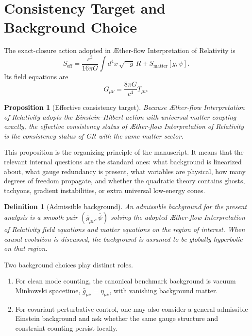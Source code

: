\documentclass[11pt]{article}
\newcommand{\Aflow}{\AE{}ther-flow}
\newcommand{\TheoryName}{\Aflow{} Interpretation of Relativity}
\newtheorem{definition}{Definition}
\newtheorem{proposition}{Proposition}
\begin{document}
\section{Consistency Target and Background Choice}

The exact-closure action adopted in \TheoryName{} is
\begin{equation}
S_{\mathrm{eff}}
=
\frac{c^3}{16\pi G}\int d^4x\,\sqrt{-g}\,R
+
S_{\mathrm{matter}}[g,\psi].
\label{eq:SA}
\end{equation}
Its field equations are
\begin{equation}
G_{\mu\nu}
=
\frac{8\pi G}{c^4}T_{\mu\nu}.
\label{eq:einstein}
\end{equation}

\begin{proposition}[Effective consistency target]
Because \TheoryName{} adopts the Einstein--Hilbert action with universal matter coupling exactly, the effective consistency status of \TheoryName{} is the consistency status of GR with the same matter sector.
\end{proposition}

This proposition is the organizing principle of the manuscript. It means that the relevant internal questions are the standard ones: what background is linearized about, what gauge redundancy is present, what variables are physical, how many degrees of freedom propagate, and whether the quadratic theory contains ghosts, tachyons, gradient instabilities, or extra universal low-energy cones.

\begin{definition}[Admissible background]
An admissible background for the present analysis is a smooth pair \((\bar g_{\mu\nu},\bar\psi)\) solving the adopted \TheoryName{} field equations and matter equations on the region of interest. When causal evolution is discussed, the background is assumed to be globally hyperbolic on that region.
\end{definition}

Two background choices play distinct roles.
\begin{enumerate}
    \item For clean mode counting, the canonical benchmark background is vacuum Minkowski spacetime, \(\bar g_{\mu\nu}=\eta_{\mu\nu}\), with vanishing background matter.
    \item For covariant perturbative control, one may also consider a general admissible Einstein background and ask whether the same gauge structure and constraint counting persist locally.
\end{enumerate}
\end{document}
